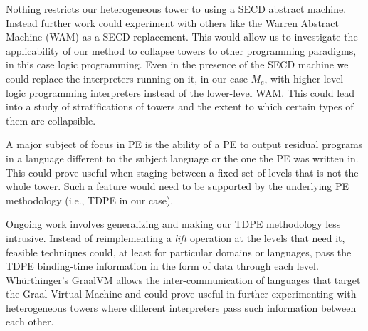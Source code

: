 \documentclass[a4paper,12pt,twoside,openright]{report}
\theoremstyle{definition}
\newcommand{\mevl}{$M_{e}$}
\begin{document}
Nothing restricts our heterogeneous tower to using a SECD abstract machine. Instead further work could experiment with others like the Warren Abstract Machine (WAM) \cite{warren1983abstract} as a SECD replacement. This would allow us to investigate the applicability of our method to collapse towers to other programming paradigms, in this case logic programming. Even in the presence of the SECD machine we could replace the interpreters running on it, in our case \mevl, with higher-level logic programming interpreters instead of the lower-level WAM. This could lead into a study of stratifications of towers and the extent to which certain types of them are collapsible.

A major subject of focus in PE is the ability of a PE to output residual programs in a language different to the subject language or the one the PE was written in. This could prove useful when staging between a fixed set of levels that is not the whole tower. Such a feature would need to be supported by the underlying PE methodology (i.e., TDPE in our case).

Ongoing work involves generalizing and making our TDPE methodology less intrusive. Instead of reimplementing a \textit{lift} operation at the levels that need it, feasible techniques could, at least for particular domains or languages, pass the TDPE binding-time information in the form of data through each level. Wh{\"u}rthinger's GraalVM \cite{wurthinger2013one} allows the inter-communication of languages that target the Graal Virtual Machine and could prove useful in further experimenting with heterogeneous towers where different interpreters pass such information between each other.
\end{document}
